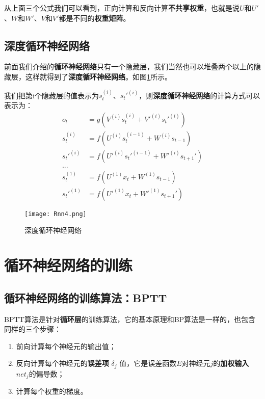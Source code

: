 从上面三个公式我们可以看到，正向计算和反向计算\textbf{不共享权重}，也就是说$U$和$U'$、$W$和$W'$、$V$和$V'$都是不同的\textbf{权重矩阵}。




\subsection{深度循环神经网络}\label{Rnn:5}
前面我们介绍的\textbf{循环神经网络}只有一个隐藏层，我们当然也可以堆叠两个以上的隐藏层，这样就得到了\textbf{深度循环神经网络}。如图\ref{fig:Rnn4}所示。


我们把第i个隐藏层的值表示为\({s}_t^{(i)}\)、\({s}_t'^{(i)}\)，则\textbf{深度循环神经网络}的计算方式可以表示为：
\begin{align*}
	{o}_t        & =g(V^{(i)}{s}_t^{(i)}+V'^{(i)}{s}_t'^{(i)})   \\
	{s}_t^{(i)}  & =f(U^{(i)}{s}_t^{(i-1)}+W^{(i)}{s}_{t-1})     \\
	{s}_t'^{(i)} & =f(U'^{(i)}{s}_t'^{(i-1)}+W'^{(i)}{s}_{t+1}') \\
	...                                                          \\
	{s}_t^{(1)}  & =f(U^{(1)}{x}_t+W^{(1)}{s}_{t-1})             \\
	{s}_t'^{(1)} & =f(U'^{(1)}{x}_t+W'^{(1)}{s}_{t+1}')
\end{align*}


\begin{figure}[!htbp]
	\centering
	\texttt{[image: Rnn4.png]}
	\caption{深度循环神经网络}
	\label{fig:Rnn4}
\end{figure}


\section{循环神经网络的训练}\label{Rnn:6}

\subsection{循环神经网络的训练算法：BPTT}\label{Rnn:7}

BPTT算法是针对\textbf{循环层}的训练算法，它的基本原理和BP算法是一样的，也包含同样的三个步骤：

\begin{enumerate}
	\item
	      前向计算每个神经元的输出值；
	\item
	      反向计算每个神经元的\textbf{误差项} \(\delta_j\) 值，它是误差函数$E$对神经元$j$的\textbf{加权输入}\(net_j\)的偏导数；
	\item
	      计算每个权重的梯度。
\end{enumerate}

